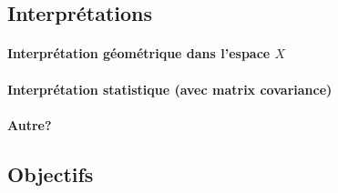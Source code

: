 \subsection{Interprétations}

\paragraph{Interprétation géométrique dans l'espace $X$}

\paragraph{Interprétation statistique (avec matrix covariance)}

\par\paragraph{Autre?}



\subsection{Objectifs}





